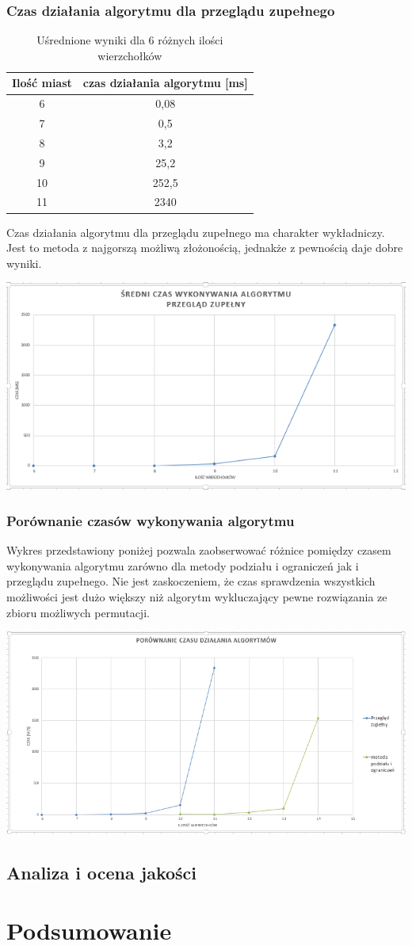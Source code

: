 \documentclass{article}
\begin{document}
	
		
		
		\subsubsection{Czas działania algorytmu dla przeglądu zupełnego}
		\begin{table}[H]
			\centering
			\caption{Uśrednione wyniki dla 6 różnych ilości wierzchołków}
			\begin{tabular}{|c|c|}
				
				\hline Ilość miast  & czas działania algorytmu [ms] \\ 
				\hline 	6& 0,08 \\ 
				\hline  7& 0,5 \\ 
				\hline  8& 3,2\\ 
				\hline  9& 25,2\\ 
				\hline  10& 252,5\\ 
				\hline  11& 2340\\ 
				
				\hline 
			\end{tabular} 
		\end{table}
		Czas działania algorytmu dla przeglądu zupełnego ma charakter wykładniczy. Jest to metoda z najgorszą możliwą złożonością, jednakże z pewnością daje dobre wyniki.
		\begin{center}
			\includegraphics[width=0.7\linewidth]{bf}
		\end{center}
		\subsubsection{Porównanie czasów wykonywania algorytmu} 
		Wykres przedstawiony poniżej pozwala zaobserwować różnice pomiędzy czasem wykonywania algorytmu zarówno dla metody podziału i ograniczeń jak i przeglądu zupełnego. Nie jest zaskoczeniem, że czas sprawdzenia wszystkich możliwości jest dużo większy niż algorytm wykluczający pewne rozwiązania ze zbioru możliwych permutacji. 
		\begin{center}
			\includegraphics[width=0.7\linewidth]{bbVSbf.png}
		\end{center}
	
	\subsection{Analiza i ocena jakości}
\section{Podsumowanie}
\end{document}
